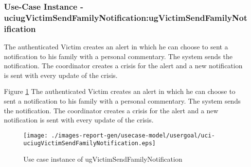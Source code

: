 
	\subsubsection{Use-Case Instance - uciugVictimSendFamilyNotification:ugVictimSendFamilyNotification}
	
	The authenticated Victim creates an alert in which he can choose to sent a notification to his family with a personal commentary. 
	The system sends the notification. The coordinator creates a crisis for the alert and a new notification is sent
	with every update of the crisis.		  
	\begin{operationmodel}
	
	\end{operationmodel} 

	
	Figure \ref{fig:lu.uni.lassy.excalibur.examples.icrash-RE-UC-uci-uciugVictimSendFamilyNotification}
	The authenticated Victim creates an alert in which he can choose to sent a notification to his family with a personal commentary. 
	The system sends the notification. The coordinator creates a crisis for the alert and a new notification is sent
	with every update of the crisis.
	
	\begin{figure}[htbp]
	\begin{center}
	
	\texttt{[image: ./images-report-gen/usecase-model/usergoal/uci-uciugVictimSendFamilyNotification.eps]}
	\end{center}
	\caption[lu.uni.lassy.excalibur.examples.icrash Sequence Diagram: uci-uciugVictimSendFamilyNotification]{Use case instance of ugVictimSendFamilyNotification}
	\label{fig:lu.uni.lassy.excalibur.examples.icrash-RE-UC-uci-uciugVictimSendFamilyNotification}
	\end{figure}
	\vspace{0.5cm}
